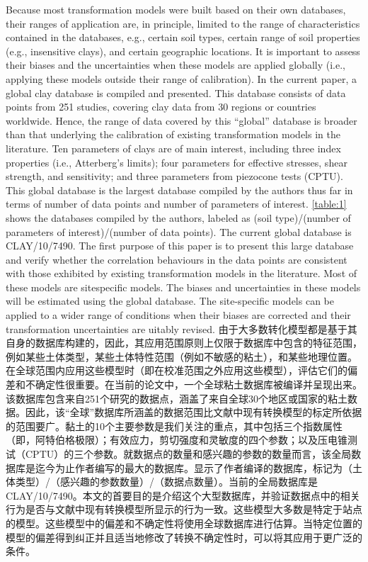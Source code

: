 \begin{Parallel}{0.60\textwidth}{}
{    }
    \ParallelPar
    \ParallelLText
    {
        Because most transformation models were built based on their own databases, their ranges of application are, in principle, limited to the range of characteristics contained in the databases, e.g., certain soil types, certain range of soil properties (e.g., insensitive clays), and certain geographic locations. It is important to assess their biases and the uncertainties when these models are applied globally (i.e., applying these models outside their range of calibration). In the current paper, a global clay database is compiled and presented. This database consists of data points from 251 studies, covering clay data from 30 regions or countries worldwide. Hence, the range of data covered by this “global” database is broader than that underlying the calibration of existing transformation models in the literature. Ten parameters of clays are of main interest, including three index properties (i.e., Atterberg’s limits); four parameters for effective stresses, shear strength, and sensitivity; and three parameters from piezocone tests (CPTU). This global database is the largest database compiled by the authors thus far in terms of number of data points and number of parameters of interest. \autoref{table:1} shows the databases compiled by the authors, labeled as (soil type)/(number of parameters of interest)/(number of data points). The current global database is CLAY/10/7490. The first purpose of this paper is to present this large database and verify whether the correlation behaviours in the data points are consistent with those exhibited by existing transformation models in the literature. Most of these models are sitespecific models. The biases and uncertainties in these models will be estimated using the global database. The site-specific models can be applied to a wider range of conditions when their biases are corrected and their transformation uncertainties are  uitably revised.
    }
    \ParallelRText
    {
        由于大多数转化模型都是基于其自身的数据库构建的，因此，其应用范围原则上仅限于数据库中包含的特征范围，例如某些土体类型，某些土体特性范围（例如不敏感的粘土），和某些地理位置。在全球范围内应用这些模型时（即在校准范围之外应用这些模型），评估它们的偏差和不确定性很重要。在当前的论文中，一个全球粘土数据库被编译并呈现出来。该数据库包含来自251个研究的数据点，涵盖了来自全球30个地区或国家的粘土数据。因此，该“全球”数据库所涵盖的数据范围比文献中现有转换模型的标定所依据的范围要广。黏土的10个主要参数是我们关注的重点，其中包括三个指数属性（即，阿特伯格极限）；有效应力，剪切强度和灵敏度的四个参数；以及压电锥测试（CPTU）的三个参数。就数据点的数量和感兴趣的参数的数量而言，该全局数据库是迄今为止作者编写的最大的数据库。显示了作者编译的数据库，标记为（土体类型）/（感兴趣的参数数量）/（数据点数量）。当前的全局数据库是CLAY/10/7490。本文的首要目的是介绍这个大型数据库，并验证数据点中的相关行为是否与文献中现有转换模型所显示的行为一致。这些模型大多数是特定于站点的模型。这些模型中的偏差和不确定性将使用全球数据库进行估算。当特定位置的模型的偏差得到纠正并且适当地修改了转换不确定性时，可以将其应用于更广泛的条件。
}
\end{Parallel}

